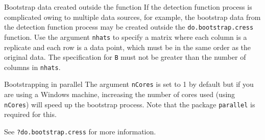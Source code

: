 \begin{block}{Bootstrap data created outside the function}
If the detection function process is complicated owing to multiple data sources, for example, the bootstrap data from the detection function process may be created outside the {\tt do.bootstrap.cress} function.  Use the argument {\tt nhats} to specify a matrix where each column is a replicate and each row is a data point, which must be in the same order as the original data.  The specification for {\tt B} must not be greater than the number of columns in {\tt nhats}.
\end{block}

\begin{block}{Bootstrapping in parallel}
The argument {\tt nCores} is set to 1 by default but if you are using a Windows machine, increasing the number of cores used (using {\tt nCores}) will speed up the bootstrap process.  Note that the package {\tt parallel} is required for this.
\end{block}

\noindent See {\tt ?do.bootstrap.cress} for more information.


%
